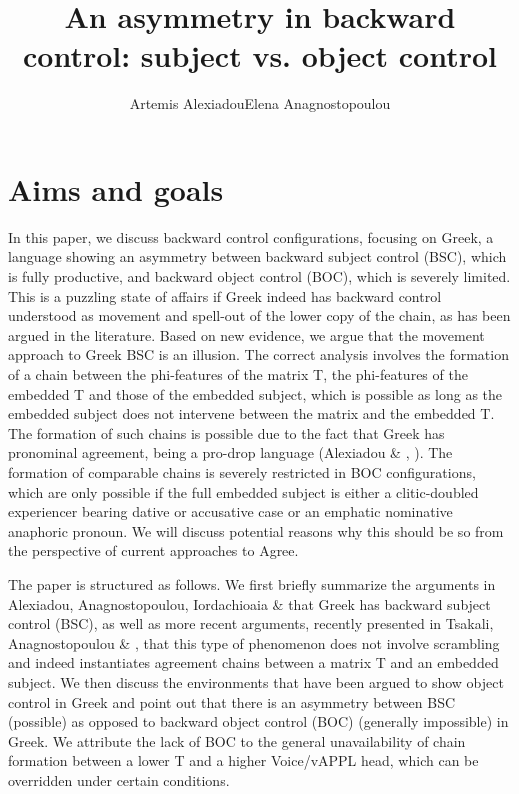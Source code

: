 \documentclass[output=paper]{langsci/langscibook}
\author{Artemis Alexiadou\affiliation{Humboldt-Universität zu Berlin}\lastand Elena Anagnostopoulou\affiliation{Leibniz-ZAS, Berlin \& University of Crete}}
\title{An asymmetry in backward control: subject vs. object control}
\begin{document}

 

\section{Aims and goals}

In this paper, we discuss backward control configurations, focusing on Greek, a language showing an asymmetry between backward subject control (BSC), which is fully productive, and backward object control (BOC), which is severely limited. This is a puzzling state of affairs if Greek indeed has backward control understood as movement and spell-out of the lower copy of the chain, as has been argued in the literature. Based on new evidence, we argue that the movement approach to Greek BSC is an illusion. The correct analysis involves the formation of a chain between the phi-features of the matrix T, the phi-features of the embedded T and those of the embedded subject, which is possible as long as the embedded subject does not intervene between the matrix and the embedded T. The formation of such chains is possible due to the fact that Greek has pronominal agreement, being a pro-drop language (Alexiadou \& \citealt{Anagnostopoulou1998}, \citealt{Barbosa2009}). The formation of comparable chains is severely restricted in BOC configurations, which are only possible if the full embedded subject is either a clitic-doubled experiencer bearing dative or accusative case or an emphatic nominative anaphoric pronoun. We will discuss potential reasons why this should be so from the perspective of current approaches to Agree. 

The paper is structured as follows. We first briefly summarize the arguments in Alexiadou, Anagnostopoulou, Iordachioaia \& \citet{Marchis2010} that Greek has backward subject control (BSC), as well as more recent arguments, recently presented in Tsakali, Anagnostopoulou \& \citet{Alexiadou2017}, that this type of phenomenon does not involve scrambling and indeed instantiates agreement chains between a matrix T and an embedded subject. We then discuss the environments that have been argued to show object control in Greek and point out that there is an asymmetry between BSC (possible) as opposed to backward object control (BOC) (generally impossible) in Greek. We attribute the lack of BOC to the general unavailability of chain formation between a lower T and a higher Voice/vAPPL head, which can be overridden under certain conditions.
\end{document}
